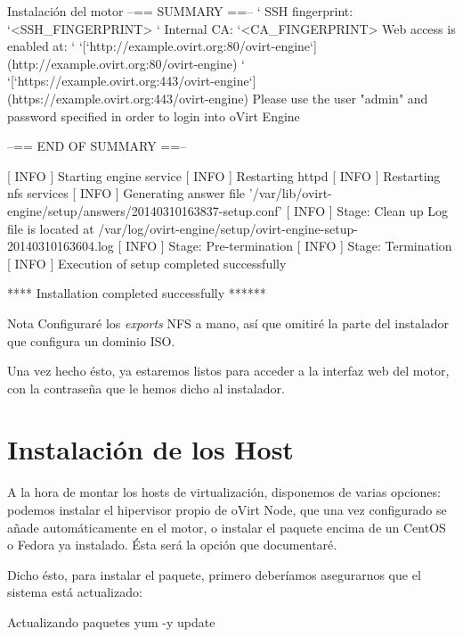 \begin{TMterminal}{}{}{Instalación del motor}
           --== SUMMARY ==--
           `         SSH fingerprint: `<SSH_FINGERPRINT> `         Internal CA: `<CA_FINGERPRINT>
           Web access is enabled at: `             `[`http://example.ovirt.org:80/ovirt-engine`](http://example.ovirt.org:80/ovirt-engine) `             `[`https://example.ovirt.org:443/ovirt-engine`](https://example.ovirt.org:443/ovirt-engine)
           Please use the user "admin" and password specified in order to login into oVirt Engine
          
           --== END OF SUMMARY ==--
          
   [ INFO  ] Starting engine service
   [ INFO  ] Restarting httpd
   [ INFO  ] Restarting nfs services
   [ INFO  ] Generating answer file '/var/lib/ovirt-engine/setup/answers/20140310163837-setup.conf'
   [ INFO  ] Stage: Clean up
           Log file is located at /var/log/ovirt-engine/setup/ovirt-engine-setup-20140310163604.log
   [ INFO  ] Stage: Pre-termination
   [ INFO  ] Stage: Termination
   [ INFO  ] Execution of setup completed successfully
     
     **** Installation completed successfully ******
\end{TMterminal}

\bigskip

\begin{TMterminal}{}{}{Nota}
  Configuraré los \emph{exports} NFS a mano, así que omitiré la parte del instalador que configura un dominio ISO.
\end{TMterminal}

Una vez hecho ésto, ya estaremos listos para acceder a la interfaz web del motor, con la contraseña que le hemos dicho al instalador.

\section{Instalación de los Host}
\label{sec:host_inst}

A la hora de montar los hosts de virtualización, disponemos de varias opciones: podemos instalar el hipervisor propio de oVirt Node, que una vez configurado se añade automáticamente en el motor, o instalar el paquete encima de un CentOS o Fedora ya instalado. Ésta será la opción que documentaré.

Dicho ésto, para instalar el paquete, primero deberíamos asegurarnos que el sistema está actualizado:

\begin{TMterminal}{}{}{Actualizando paquetes}
  yum -y update
\end{TMterminal}

